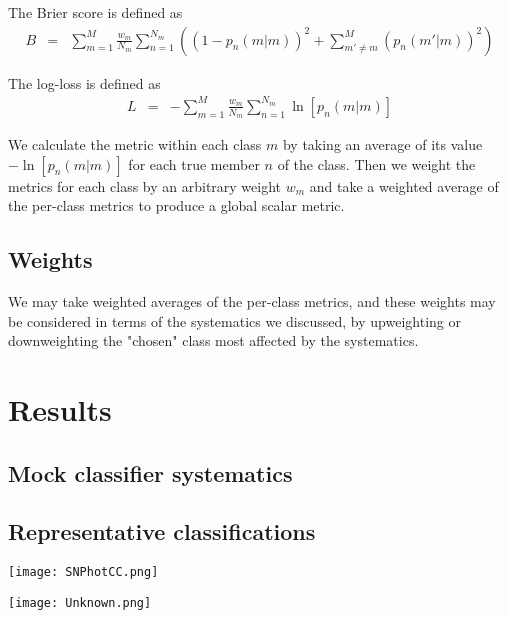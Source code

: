 \documentclass[\docopts]{\docclass}
\begin{document}
The Brier score is defined as
\begin{eqnarray}
B &=& \sum_{m=1}^{M}\frac{w_{m}}{N_{m}}\sum_{n=1}^{N_{m}}\left((1-p_{n}(m | m))^{2}+\sum_{m'\neq m}^{M}(p_{n}(m' | m))^{2}\right)
\end{eqnarray}

The log-loss is defined as
\begin{eqnarray}
L &=& -\sum_{m=1}^{M}\frac{w_{m}}{N_{m}}\sum_{n=1}^{N_{m}}\ln[p_{n}(m | m)]
\end{eqnarray}

We calculate the metric within each class $m$ by taking an average of its value $-\ln[p_{n}(m | m)]$ for each true member $n$ of the class.  Then we weight the metrics for each class by an arbitrary weight $w_{m}$ and take a weighted average of the per-class metrics to produce a global scalar metric.

\subsection{Weights}
\label{sec:weights}

We may take weighted averages of the per-class metrics, and these weights may be considered in terms of the systematics we discussed, by upweighting or downweighting the "chosen" class most affected by the systematics.

\section{Results}
\label{sec:results}

\subsection{Mock classifier systematics}
\label{sec:mockresults}

\subsection{Representative classifications}
\label{sec:realresults}

\begin{figure*}
	\begin{center}
		\texttt{[image: SNPhotCC.png]}\\
		\caption{}
		\label{fig:snphotcc_metric_compare}
	\end{center}
\end{figure*}

\begin{figure*}
	\begin{center}
		\texttt{[image: Unknown.png]}\\
		\caption{}
		\label{fig:unknown_metric_compare}
	\end{center}
\end{figure*}
\end{document}
